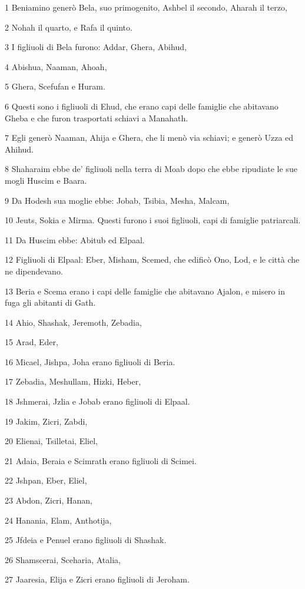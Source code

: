 \par 1 Beniamino generò Bela, suo primogenito, Ashbel il secondo, Aharah il terzo,
\par 2 Nohah il quarto, e Rafa il quinto.
\par 3 I figliuoli di Bela furono: Addar, Ghera, Abihud,
\par 4 Abishua, Naaman, Ahoah,
\par 5 Ghera, Scefufan e Huram.
\par 6 Questi sono i figliuoli di Ehud, che erano capi delle famiglie che abitavano Gheba e che furon trasportati schiavi a Manahath.
\par 7 Egli generò Naaman, Ahija e Ghera, che li menò via schiavi; e generò Uzza ed Ahihud.
\par 8 Shaharaim ebbe de' figliuoli nella terra di Moab dopo che ebbe ripudiate le sue mogli Huscim e Baara.
\par 9 Da Hodesh sua moglie ebbe: Jobab, Tsibia, Mesha, Malcam,
\par 10 Jeuts, Sokia e Mirma. Questi furono i suoi figliuoli, capi di famiglie patriarcali.
\par 11 Da Huscim ebbe: Abitub ed Elpaal.
\par 12 Figliuoli di Elpaal: Eber, Misham, Scemed, che edificò Ono, Lod, e le città che ne dipendevano.
\par 13 Beria e Scema erano i capi delle famiglie che abitavano Ajalon, e misero in fuga gli abitanti di Gath.
\par 14 Ahio, Shashak, Jeremoth, Zebadia,
\par 15 Arad, Eder,
\par 16 Micael, Jishpa, Joha erano figliuoli di Beria.
\par 17 Zebadia, Meshullam, Hizki, Heber,
\par 18 Jshmerai, Jzlia e Jobab erano figliuoli di Elpaal.
\par 19 Jakim, Zicri, Zabdi,
\par 20 Elienai, Tsilletai, Eliel,
\par 21 Adaia, Beraia e Scimrath erano figliuoli di Scimei.
\par 22 Jshpan, Eber, Eliel,
\par 23 Abdon, Zicri, Hanan,
\par 24 Hanania, Elam, Anthotija,
\par 25 Jfdeia e Penuel erano figliuoli di Shashak.
\par 26 Shamscerai, Sceharia, Atalia,
\par 27 Jaaresia, Elija e Zicri erano figliuoli di Jeroham.
